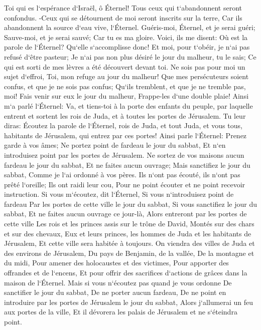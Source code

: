 \verse Toi qui es l`espérance d`Israël, ô Éternel! Tous ceux qui t`abandonnent seront confondus. -Ceux qui se détournent de moi seront inscrits sur la terre, Car ils abandonnent la source d`eau vive, l`Éternel. 
\verse Guéris-moi, Éternel, et je serai guéri; Sauve-moi, et je serai sauvé; Car tu es ma gloire. 
\verse Voici, ils me disent: Où est la parole de l`Éternel? Qu`elle s`accomplisse donc! 
\verse Et moi, pour t`obéir, je n`ai pas refusé d`être pasteur; Je n`ai pas non plus désiré le jour du malheur, tu le sais; Ce qui est sorti de mes lèvres a été découvert devant toi. 
\verse Ne sois pas pour moi un sujet d`effroi, Toi, mon refuge au jour du malheur! 
\verse Que mes persécuteurs soient confus, et que je ne sois pas confus; Qu`ils tremblent, et que je ne tremble pas, moi! Fais venir sur eux le jour du malheur, Frappe-les d`une double plaie! 
\verse Ainsi m`a parlé l`Éternel: Va, et tiens-toi à la porte des enfants du peuple, par laquelle entrent et sortent les rois de Juda, et à toutes les portes de Jérusalem. 
\verse Tu leur diras: Écoutez la parole de l`Éternel, rois de Juda, et tout Juda, et vous tous, habitants de Jérusalem, qui entrez par ces portes! 
\verse Ainsi parle l`Éternel: Prenez garde à vos âmes; Ne portez point de fardeau le jour du sabbat, Et n`en introduisez point par les portes de Jérusalem. 
\verse Ne sortez de vos maisons aucun fardeau le jour du sabbat, Et ne faites aucun ouvrage; Mais sanctifiez le jour du sabbat, Comme je l`ai ordonné à vos pères. 
\verse Ils n`ont pas écouté, ils n`ont pas prêté l`oreille; Ils ont raidi leur cou, Pour ne point écouter et ne point recevoir instruction. 
\verse Si vous m`écoutez, dit l`Éternel, Si vous n`introduisez point de fardeau Par les portes de cette ville le jour du sabbat, Si vous sanctifiez le jour du sabbat, Et ne faites aucun ouvrage ce jour-là, 
\verse Alors entreront par les portes de cette ville Les rois et les princes assis sur le trône de David, Montés sur des chars et sur des chevaux, Eux et leurs princes, les hommes de Juda et les habitants de Jérusalem, Et cette ville sera habitée à toujours. 
\verse On viendra des villes de Juda et des environs de Jérusalem, Du pays de Benjamin, de la vallée, De la montagne et du midi, Pour amener des holocaustes et des victimes, Pour apporter des offrandes et de l`encens, Et pour offrir des sacrifices d`actions de grâces dans la maison de l`Éternel. 
\verse Mais si vous n`écoutez pas quand je vous ordonne De sanctifier le jour du sabbat, De ne porter aucun fardeau, De ne point en introduire par les portes de Jérusalem le jour du sabbat, Alors j`allumerai un feu aux portes de la ville, Et il dévorera les palais de Jérusalem et ne s`éteindra point. 

